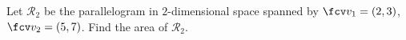 \begin{frame}
\begin{example}
Let $\mathcal R_2$ be the parallelogram in $2$-dimensional space spanned by $\fcv v_1=(2,3)$, $\fcv v_2=(5,7)$. Find the area of $\mathcal R_2$.
\end{example}
\end{frame}